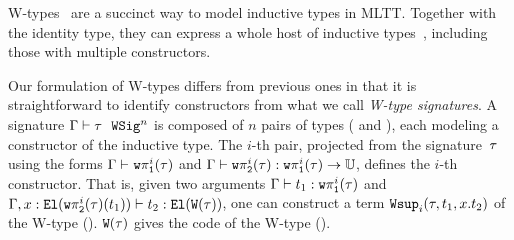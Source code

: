 

W-types~\cite{martin1984intuitionistic} are a succinct way to model
inductive types in MLTT.
Together with the identity type, they can express a whole host of inductive
types~\cite{hugunin2021not}, including those with multiple constructors.

Our formulation of W-types differs from previous ones in that it is
straightforward to identify constructors from what we call \emph{W-type signatures}.
%
A signature $ {\Gamma} \vdash {\ensuremath{\tau}} \ \ \texttt{WSig}^{n} $ is
composed of $n$ pairs of types ( and ),
%
each modeling a constructor of the inductive type.
The $i$-th pair, projected from the signature~$\tau$ using the forms
$ {\Gamma} \vdash_{} {\texttt{w}\pi^{i}_{\texttt{1}}({\tau})} $ and
$ {\Gamma} \vdash {\ensuremath{\texttt{w}\pi^{i}_{\texttt{2}}({\tau})}} : {\texttt{w}\pi^{i}_{\texttt{1}}({\tau}) \to \mathbb{U}} $,
defines the $i$-th constructor.
That is, given two arguments $ {\Gamma} \vdash {t_1} : {\texttt{w}\pi^{i}_{\texttt{1}}({\tau})} $ and
$ {\Gamma, x : \texttt{El}({\texttt{w}\pi^{i}_{\texttt{2}}({\tau})(t_1)}) } \vdash {t_2} : {\texttt{El}({\texttt{W}({\tau})})} $,
one can construct a term $\texttt{Wsup}_{i}({\tau},{t_1},{x.t_2})$ of the W-type \El{\wcode{\wsig}} ().
$\texttt{W}({\tau})$ gives the code of the
W-type ().

